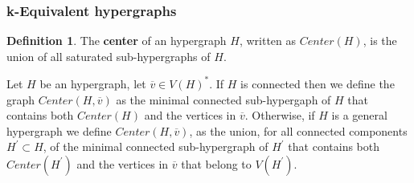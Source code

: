 \documentclass[12pt,notitlepage,a4paper]{article}
\theoremstyle{definition}
\newtheorem{definition}{Definition}[section]
\newcommand{\N}{\mathbb{N}}
\begin{document}
\subsubsection{k-Equivalent hypergraphs} \label{sect:equivunicycles}


\begin{definition} \label{def:Center}
	The \textbf{center} of an hypergraph $H$, written as
	$Center(H)$,  
	is the union of all saturated sub-hypergraphs of $H$. 
	\par
	Let $H$ be an hypergraph, let $\overline{v}\in V(H)^*$. 
	If $H$
	is connected then we define the graph
	$Center(H,\overline{v})$
	as the minimal connected sub-hypergaph of $H$ that contains
	both $Center(H)$
	and the vertices in $\overline{v}$. Otherwise,
	if $H$ is a general hypergraph we define $Center(H,\overline{v})$,
	as the union, for all connected components $H^\prime \subset H$,
	of the minimal connected sub-hypergraph of $H^\prime$ that
	contains both $Center(H^\prime)$
	and the vertices in $\overline{v}$
	that belong to $V(H^\prime)$.
\end{definition}
\end{document}
